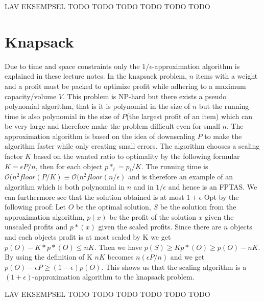 LAV EKSEMPSEL TODO TODO TODO TODO TODO TODO

\section{Knapsack}
Due to time and space constraints only the $1/\epsilon$-approximation algorithm is explained in these lecture notes. In the knapsack problem, $n$ items with a weight and a profit must be packed to optimize profit while adhering to a maximum capacity/volume $V$. This problem is NP-hard but there exists a pseudo polynomial algorithm, that is it is polynomial in the size of $n$ but the running time is also polynomial in the size of $P$(the largest profit of an item) which can be very large and therefore make the problem difficult even for small $n$. The approximation algorithm is based on the idea of downscaling $P$ to make the algorithm faster while only creating small errors. The algorithm chooses a scaling factor $K$ based on the wanted ratio to optimality by the following formular $K=\epsilon P/n$, then for each object $p*_i = p_i/K$. The running time is $\mathcal{O}(n^2 floor(P/K) \equiv \mathcal{O}(n^2 floor(n/\epsilon)$ and is therefore an example of an algorithm which is both polynomial in $n$ and in $1/\epsilon$ and hence is an FPTAS. We can furthermore see that the solution obtained is at most $1+\epsilon$-Opt by the following proof: Let $O$ be the optimal solution, $S$ be the solution from the approximation algorithm, $p(x)$ be the profit of the solution $x$ given the unscaled profits and $p*(x)$ given the scaled profits. Since there are $n$ objects and each objects profit is at most scaled by K we get $p(O) - K*p*(O) \le nK$. Then we have $p(S) \ge Kp*(O) \ge p(O)-n K$. By using the definition of K $n K$ becomes $n (\epsilon P/n)$ and we get $p(O) - \epsilon P \ge (1-\epsilon) p(O)$. This shows us that the scaling algorithm is a $(1+\epsilon)$-approximation algorithm to the knapsack problem.

LAV EKSEMPSEL TODO TODO TODO TODO TODO TODO
